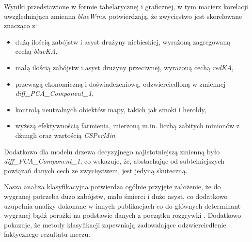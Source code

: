 \documentclass[twoside]{customStyle}
\begin{document}
Wyniki przedstawione w formie tabelarycznej i graficznej, w tym macierz korelacji uwzględniająca zmienną \textit{blueWins}, potwierdzają, że zwycięstwo jest skorelowane znacząco z:
\begin{itemize}
\item dużą ilością zabójstw i asyst drużyny niebieskiej, wyrażoną zagregowaną cechą \textit{blueKA},
\item małą ilością zabójstw i asyst drużyny przeciwnej, wyrażoną cechą \textit{redKA},
\item przewagą ekonomiczną i doświadczeniową, odzwierciedloną w zmiennej \textit{diff\_PCA\_Component\_1},
\item kontrolą neutralnych obiektów mapy, takich jak smoki i heroldy,
\item wyższą efektywnością farmienia, mierzoną m.in. liczbą zabitych minionów z dżungli oraz wartością \textit{CSPerMin}.
\end{itemize}

Dodatkowo dla modelu drzewa decyzyjnego najistotniejszą zmienną było \textit{diff\_PCA\_Component\_1}, co wskazuje, że, abstachując od subtelniejszych powiązań danych cech ze zwycięstwem, jest jedyną skuteczną. 

Nasza analiza klasyfikacyjna potwierdza ogólnie przyjęte założenie, że do wygranej potrzeba dużo zabójstw, mało śmierci i dużo asyst, co dodatkowo uzupełnia analizy dokonane w innych publikacjach co do głównych determinant wygranej bądź porażki na podstawie danych z początku rozgrywki \cite{gasmi_lol_first10, wang_lol_win, arancio_decisions_10min}. Dodatkowo pokazuje, że metody klasyfikacji zapewniają zadowalające odzwierciedlenie faktycznego rezultatu meczu. 

\newpage
\end{document}
